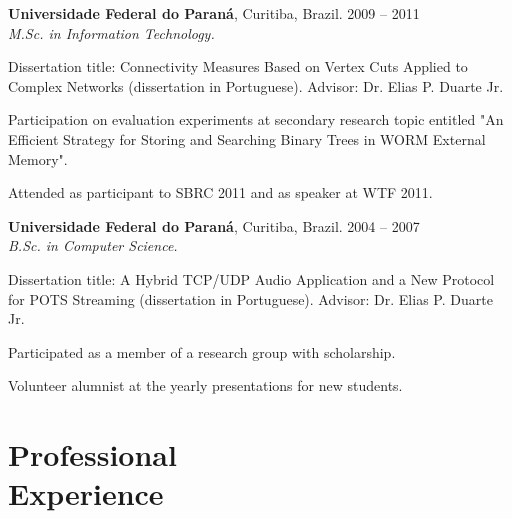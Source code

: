 \documentclass[margin,centered,10pt]{resume}
\begin{document}
\begin{resume}
    \textbf{Universidade Federal do Paraná}, Curitiba, Brazil.
    \hfill 2009 – 2011
    \\
    \textsl{M.Sc. in Information Technology.}
    \vspace{-3mm}\\\vspace{-1mm}%
    \begin{list3}
    \item Dissertation title: Connectivity Measures Based on Vertex Cuts Applied to Complex Networks (dissertation in Portuguese). Advisor: Dr. Elias P. Duarte Jr.
    \item Participation on evaluation experiments at secondary research topic entitled "An Efficient Strategy for Storing and Searching Binary Trees in WORM External Memory".
    \item Attended as participant to SBRC 2011 and as speaker at WTF 2011.
    \end{list3}
    \vspace{-1.5mm}%

    
    \textbf{Universidade Federal do Paraná}, Curitiba, Brazil.
    \hfill 2004 – 2007
    \\
    \textsl{B.Sc. in Computer Science.}
    \vspace{-3mm}\\\vspace{-1mm}%
    \begin{list3}
    \item Dissertation title: A Hybrid TCP/UDP Audio Application and a New Protocol for POTS Streaming (dissertation in Portuguese). Advisor: Dr. Elias P. Duarte Jr.
    \item Participated as a member of a research group with scholarship. 
    \item Volunteer alumnist at the yearly presentations for new students.
    \end{list3}
    \vspace{1.5mm}%
    \sectionline
    \vspace{-3mm}%
    
    
    \section{\mysidestyle \textcolor{resumecolor}{Professional\\Experience}}


\end{resume}
\end{document}
